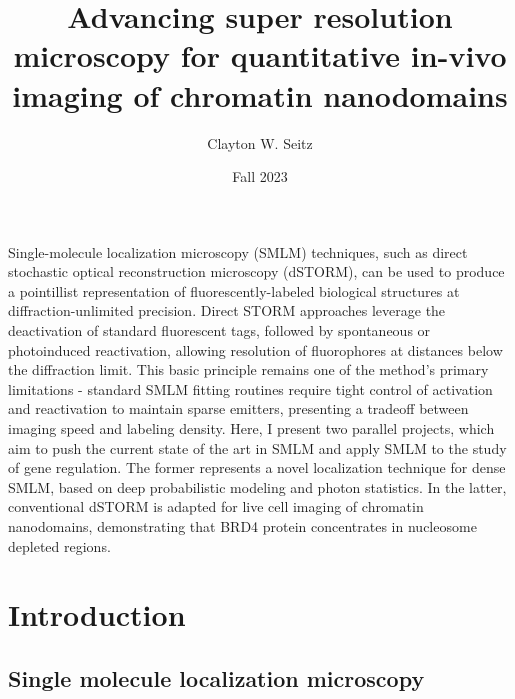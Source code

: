 \documentclass{ucetd}
\title{Advancing super resolution microscopy for quantitative in-vivo imaging of chromatin nanodomains}
\author{Clayton W. Seitz}
\date{Fall 2023}
\begin{document}
\maketitle



\tableofcontents


\abstract

Single-molecule localization microscopy (SMLM) techniques, such as direct stochastic optical reconstruction microscopy (dSTORM), can be used to produce a pointillist representation of fluorescently-labeled biological structures at diffraction-unlimited precision. Direct STORM approaches leverage the deactivation of standard fluorescent tags, followed by spontaneous or photoinduced reactivation, allowing resolution of fluorophores at distances below the diffraction limit. This basic principle remains one of the method's primary limitations - standard SMLM fitting routines require tight control of activation and reactivation to maintain sparse emitters, presenting a tradeoff between imaging speed and labeling density. Here, I present two parallel projects, which aim to push the current state of the art in SMLM and apply SMLM to the study of gene regulation. The former represents a novel localization technique for dense SMLM, based on deep probabilistic modeling and photon statistics. In the latter, conventional dSTORM is adapted for live cell imaging of chromatin nanodomains, demonstrating that BRD4 protein concentrates in nucleosome depleted regions.

\clearpage

\mainmatter



\section{Introduction}

\subsection{Single molecule localization microscopy}
\end{document}
